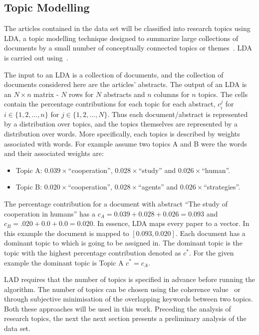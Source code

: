 \subsection{Topic Modelling}\label{section:lda_introduction}

The articles contained in the data set will be classified
into research topics using LDA, a topic modelling technique
designed to summarize large collections of documents by a small number of
conceptually connected topics or themes~\cite{Blei2003, Grimmer2013}. LDA is
carried out using~\cite{rehurek_lrec}.

The input to an LDA is a collection of documents, and the collection of
documents considered here are the articles' abstracts. The output of an LDA is
an \(N \times n\) matrix - \(N\) rows for \(N\) abstracts and \(n\) columns for
\(n\) topics. The cells contain the percentage contributions for each topic for
each abstract, \(c_i^ j\) for \(i \in \{1, 2, \dots, n\}\) for \(j \in \{1, 2,
\dots, N\}\). Thus each document/abstract is represented by a distribution over
topics, and the topics themselves are represented by a distribution over words.
More specifically, each topics is described by weights associated with words.
For example assume two topics A and B were the words and their associated weights
are:

\begin{itemize}
    \item Topic A: \(0.039 \times\)``cooperation'', \(0.028 \times\)``study'' and \(0.026 \times\)``human''.
    \item Topic B: \(0.020 \times\)``cooperation'', \(0.028 \times\)``agents'' and
    \(0.026 \times\)``strategies''.
\end{itemize}

The percentage contribution for a document with abstract ``The study of
cooperation in humans'' has a \(c_{A} = 0.039 + 0.028 + 0.026 = 0.093\) and
\(c_B = .020 + 0.0 + 0.0 = 0.020\). In essence, LDA maps every paper to a
vector. In this example the document is mapped to \([0.093, 0.020]\). Each
document has a dominant topic to which is going to be assigned in. The dominant
topic is the topic with the highest percentage contribution denoted as \(c^*\).
For the given example the dominant topic is Topic A \(c^*=c_A\).

LAD requires that the number of topics is specified in advance before running
the algorithm. The number of topics can be chosen using the coherence
value~\cite{Roder2015} or through subjective minimisation of the overlapping
keywords between two topics. Both these approaches will be used in this work.
Preceding the analysis of research topics, the next the next section presents a
preliminary analysis of the data set.

